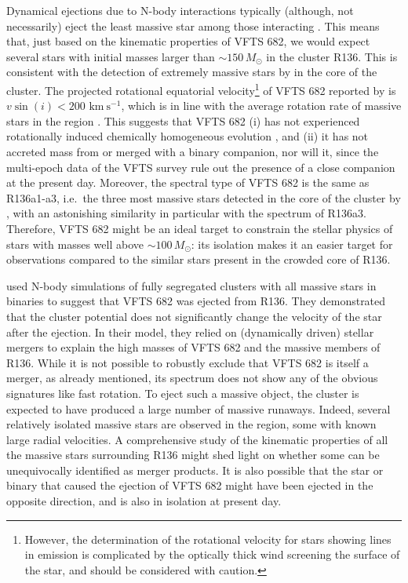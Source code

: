 \documentclass[apjl,twocolumn]{emulateapj}
\newcommand{\kms}{{\,\mathrm{km\ s^{-1}}}}
\begin{document}
Dynamical ejections due to N-body interactions typically (although, not necessarily) eject the least
massive star among those interacting \cite[e.g.,][]{banerjee:12}. This means that, just
based on the kinematic properties of VFTS 682, we would expect several
stars with initial masses larger than $\sim$$150\,M_\odot$ in the
cluster R136.
This is consistent with the detection
of extremely massive stars by \cite{crowther:10} in the core of the
cluster. The projected rotational equatorial
velocity\footnote{However, the determination of the rotational
  velocity for stars showing lines in emission is complicated by the optically thick wind screening the surface of the star, and should be
  considered with caution.} of VFTS 682
reported by \cite{schneider:18} is $v\sin(i)<200\,\kms$, which is in
line with the average rotation rate of massive stars in the region
\citep[][]{ramirez-agudelo:15}. This suggests that VFTS 682 (i) has not
experienced rotationally induced chemically homogeneous evolution
\citep[][]{maeder:00,demink:09,marchant:16}, and (ii) it has not
accreted mass from or merged with a binary companion, nor will it, since the multi-epoch
data of the VFTS survey rule out the presence of a close companion at the
present day. Moreover, the spectral type of VFTS 682
\citep[WNh5,][]{bestenlehner:11} is the same as R136a1-a3, i.e.~the
three most massive stars detected in the core of the cluster by
\cite{dekoter:97,crowther:10,crowther:16}, with an astonishing similarity in particular with
the spectrum of R136a3. Therefore,
VFTS 682 might be an ideal target to constrain the stellar physics of
stars with masses well above $\sim$$100\,M_\odot$: its isolation makes
it an easier target for observations compared to the similar stars
present in the crowded core of R136.

\citet{banerjee:12} used N-body simulations of fully segregated
clusters with all massive stars in binaries to suggest that VFTS 682
was ejected from R136. They
demonstrated that the cluster potential does not significantly change
the velocity of the star after the ejection. In their
model, they relied on (dynamically driven) stellar mergers to explain the high masses of
VFTS 682 and the massive members of R136. While it is not possible to
robustly exclude that VFTS 682 is itself a merger, as already
mentioned, its spectrum does not show any of the obvious signatures
like fast rotation. To eject such a massive object, the cluster is
expected to have produced
a large number of massive runaways. Indeed, several relatively
isolated massive stars are observed in the region, some with known
large radial velocities. A comprehensive study of the kinematic
properties of all the massive stars surrounding R136 might shed light
on whether some can be unequivocally identified as merger products. It
is also possible that the star or binary that caused the ejection of
VFTS 682 might have been ejected in the opposite direction, and is also
in isolation at present day. 
\end{document}
